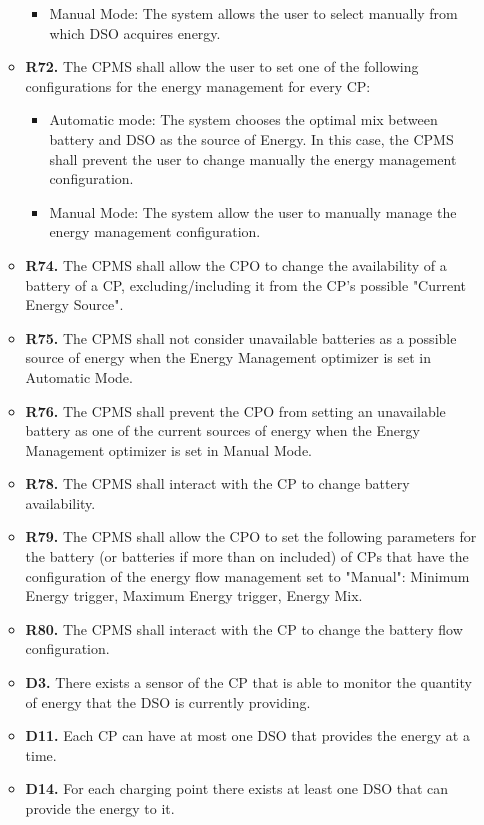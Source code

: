 \documentclass{Configuration_Files/PoliMi3i_thesis}
\begin{document}
\begin{enumerate}[label=\textbf{G\arabic*}]
\begin{itemize}
\begin{itemize}
                    \item Manual Mode: The system allows the user to select manually from which DSO acquires energy.
                \end{itemize}
            \item \textbf{R72.} The CPMS shall allow the user to set one of the following configurations for the energy management for every CP:
                \begin{itemize}
                    \item Automatic mode: The system chooses the optimal mix between battery and DSO as the source of Energy. In this case, the CPMS shall prevent the user to change manually the energy management configuration.
                    \item Manual Mode: The system allow the user to manually  manage the energy management configuration.
                \end{itemize}
            \item \textbf{R74.} The CPMS shall allow the CPO to change the availability of a battery of a CP, excluding/including it from the CP's possible "Current Energy Source".
            \item \textbf{R75.} The CPMS shall not consider unavailable batteries as  a possible source of energy when the Energy Management optimizer is set in Automatic Mode.
            \item \textbf{R76.} The CPMS shall prevent the CPO from setting an unavailable battery as one of the current sources of energy when the Energy Management optimizer is set in Manual Mode.
            \item \textbf{R78.} The CPMS shall interact with the CP to change battery availability.
            \item \textbf{R79.} The CPMS shall allow the CPO to set the following  parameters for the battery (or batteries if more than on included) of CPs that have the configuration of the energy flow management set to  "Manual": Minimum Energy trigger, Maximum Energy trigger, Energy Mix.
            \item \textbf{R80.} The CPMS shall interact with the CP to change the battery flow configuration.
            \item \textbf{D3.} There exists a sensor of the CP that is able to monitor the quantity of energy that the DSO is currently providing.
            \item \textbf{D11.} Each CP can have at most one DSO that provides the energy at a time.
            \item \textbf{D14.} For each charging point there exists at least one DSO that can provide the energy to it.
        \end{itemize}


\end{enumerate}
\end{document}
